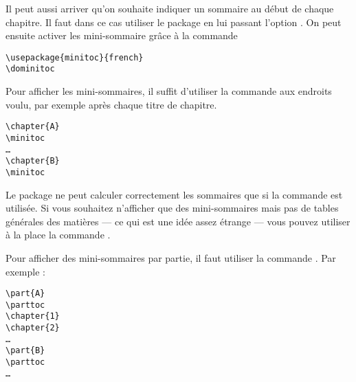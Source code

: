 Il peut aussi arriver qu'on souhaite indiquer un sommaire au début de chaque chapitre. Il faut dans ce cas utiliser le package  en lui passant l'option . On peut ensuite activer les mini-sommaire grâce à la commande 

\begin{verbatim}
\usepackage{minitoc}{french}
\dominitoc
\end{verbatim}

Pour afficher les mini-sommaires, il suffit d'utiliser la commande  aux endroits voulu, par exemple après chaque titre de chapitre.

\begin{verbatim}
\chapter{A}
\minitoc
…
\chapter{B}
\minitoc
\end{verbatim}

\begin{attention}
Le package ne peut calculer correctement les sommaires que si la commande  est utilisée. Si vous souhaitez n'afficher que des mini-sommaires mais pas de tables générales des matières --- ce qui est une idée assez étrange --- vous pouvez utiliser à la place la commande .
\end{attention}

Pour afficher des mini-sommaires par partie, il faut utiliser la commande . Par exemple :

\begin{verbatim}
\part{A}
\parttoc
\chapter{1}
\chapter{2}
…
\part{B}
\parttoc
…
\end{verbatim}


